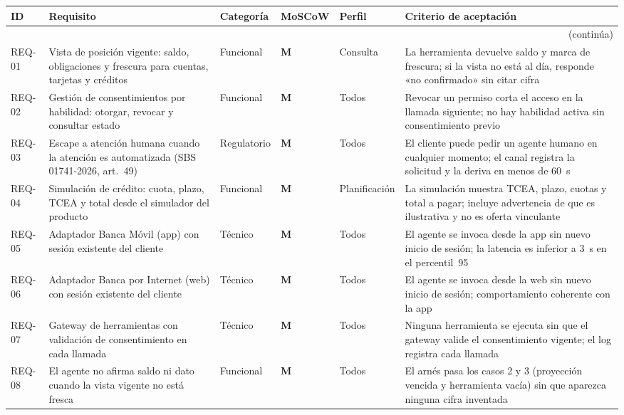 \documentclass[11pt]{article}
\newcommand{\mos}[1]{\textbf{\textcolor{bcp}{#1}}}
\begin{document}
\begin{longtable}{@{}p{1.1cm} p{4.0cm} p{1.9cm} p{1.1cm} p{1.9cm} p{4.3cm}@{}}
\toprule
\textbf{ID} & \textbf{Requisito} & \textbf{Categoría} & \textbf{MoSCoW} & \textbf{Perfil} & \textbf{Criterio de aceptación} \\
\midrule
\endhead
\midrule\multicolumn{6}{r}{\small(continúa)}\\
\endfoot
\bottomrule
\endlastfoot
REQ-01 & Vista de posición vigente: saldo, obligaciones y frescura para cuentas, tarjetas y créditos & Funcional & \mos{M} & Consulta & La herramienta devuelve saldo y marca de frescura; si la vista no está al día, responde «no confirmado» sin citar cifra \\[0.3em]
REQ-02 & Gestión de consentimientos por habilidad: otorgar, revocar y consultar estado & Funcional & \mos{M} & Todos & Revocar un permiso corta el acceso en la llamada siguiente; no hay habilidad activa sin consentimiento previo \\[0.3em]
REQ-03 & Escape a atención humana cuando la atención es automatizada (SBS 01741-2026, art.~49) & Regulatorio & \mos{M} & Todos & El cliente puede pedir un agente humano en cualquier momento; el canal registra la solicitud y la deriva en menos de 60~s \\[0.3em]
REQ-04 & Simulación de crédito: cuota, plazo, TCEA y total desde el simulador del producto & Funcional & \mos{M} & Planificación & La simulación muestra TCEA, plazo, cuotas y total a pagar; incluye advertencia de que es ilustrativa y no es oferta vinculante \\[0.3em]
REQ-05 & Adaptador Banca Móvil (app) con sesión existente del cliente & Técnico & \mos{M} & Todos & El agente se invoca desde la app sin nuevo inicio de sesión; la latencia es inferior a 3~s en el percentil~95 \\[0.3em]
REQ-06 & Adaptador Banca por Internet (web) con sesión existente del cliente & Técnico & \mos{M} & Todos & El agente se invoca desde la web sin nuevo inicio de sesión; comportamiento coherente con la app \\[0.3em]
REQ-07 & Gateway de herramientas con validación de consentimiento en cada llamada & Técnico & \mos{M} & Todos & Ninguna herramienta se ejecuta sin que el gateway valide el consentimiento vigente; el log registra cada llamada \\[0.3em]
REQ-08 & El agente no afirma saldo ni dato cuando la vista vigente no está fresca & Funcional & \mos{M} & Todos & El arnés pasa los casos 2 y 3 (proyección vencida y herramienta vacía) sin que aparezca ninguna cifra inventada \\[0.3em]

\end{longtable}
\end{document}
